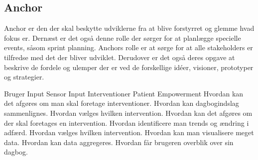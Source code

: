\subsection{Anchor}
Anchor er den der skal beskytte udviklerne fra at blive forstyrret og glemme hvad fokus er.
Dernæst er det også denne rolle der sørger for at planlægge specielle events, såsom sprint planning.
Anchors rolle er at sørge for at alle stakeholders er tilfredse med det der bliver udviklet.
Derudover er det også deres opgave at beskrive de fordele og ulemper der er ved de forskellige idéer, visioner, prototyper og strategier.

\coord
  {Bruger Input}
  {Sensor Input}
  {Interventioner}
  {Patient Empowerment}
  {Hvordan kan det afgøres om man skal foretage interventioner.
    Hvordan kan dagbogindslag sammenlignes.
    Hvordan vælges hvilken intervention.}
  {Hvordan kan det afgøres om der skal foretages en intervention.
    Hvordan identificere man trends og ændring i adfærd.
    Hvordan vælges hvilken intervention.}
  {Hvordan kan man visualisere meget data.
    Hvordan kan data aggregeres.}
  {Hvordan får brugeren overblik over sin dagbog.}
